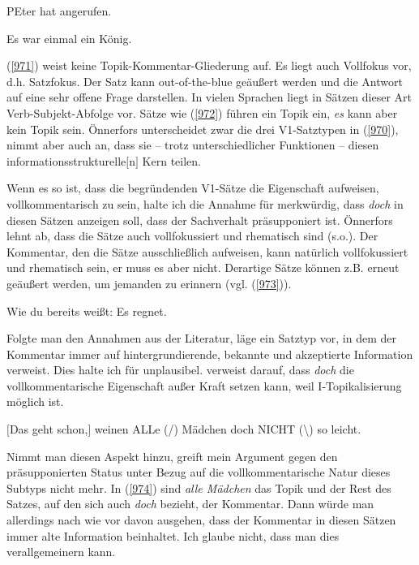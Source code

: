 {\begin{exe}
	\ex\label{971}
	PEter hat angerufen.
\end{exe}
\vspace{-0.65cm}
\begin{exe}
	\ex\label{972}
	Es war einmal ein König.
	\hfill\hbox{\citet[305]{Oennerfors1997a}}
\end{exe}
(\ref{971}) weist keine Topik-Kommentar-Gliederung auf. Es liegt auch Vollfokus vor, d.h.  Satzfokus. Der Satz kann out-of-the-blue  geäußert werden und die Antwort auf eine sehr offene Frage darstellen. In vielen Sprachen liegt in Sätzen dieser Art Verb-Subjekt-Abfolge vor. Sätze wie (\ref{972}) führen ein Topik ein, \textit{es} kann aber kein Topik sein. Önnerfors unterscheidet zwar die drei V1-Satztypen in (\ref{970}), nimmt aber auch an, dass sie – trotz unterschiedlicher Funktionen – diesen \glqq informations\-strukturelle$[$n$]$ Kern\grqq{} teilen.

Wenn es so ist, dass die begründenden V1-Sätze die Eigenschaft aufweisen, vollkommentarisch zu sein, halte ich die Annahme für merkwürdig, dass \textit{doch} in diesen Sätzen anzeigen soll, dass der Sachverhalt präsupponiert  ist. Önnerfors lehnt ab,  dass die Sätze auch vollfokussiert und rhematisch sind (s.o.). Der Kommentar, den die Sätze ausschließlich aufweisen, kann natürlich vollfokussiert und rhematisch sein, er muss es aber nicht. Derartige Sätze können z.B. erneut geäußert werden, um jemanden zu erinnern (vgl. (\ref{973})).

\begin{exe}
	\ex\label{973}
	Wie du bereits weißt: Es regnet.
\end{exe}
Folgte man den Annahmen aus der Literatur, läge ein Satztyp vor, in dem der Kommentar immer auf hintergrundierende, bekannte und akzeptierte Information verweist. Dies halte ich für unplausibel. \citet[223, Fn 22]{Reis2000} verweist darauf, dass \textit{doch} die vollkommentarische Eigenschaft außer Kraft setzen kann, weil I-Topikalisierung  möglich ist.

\begin{exe}
	\ex\label{974}
	$[$Das geht schon,$]$ weinen ALLe (/) Mädchen doch NICHT (\textbackslash) so leicht.
\end{exe}
Nimmt man diesen Aspekt hinzu, greift mein Argument gegen den präsupponier\-ten  Status unter Bezug auf die vollkommentarische Natur dieses Subtyps nicht mehr. In (\ref{974}) sind \textit{alle Mädchen} das Topik  und der Rest des Satzes, auf den sich auch \textit{doch} bezieht, der Kommentar. Dann würde man allerdings nach wie vor davon ausgehen, dass der Kommentar  in diesen Sätzen immer alte Information beinhaltet. Ich glaube nicht, dass man dies verallgemeinern kann.

}
